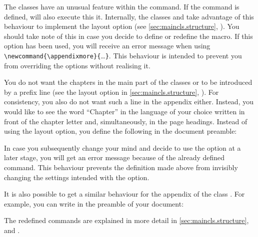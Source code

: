 \begin{Declaration}
\end{Declaration}%
The \KOMAScript{} classes have an unusual feature within the
 command.  If the  command
is defined,  will also execute this
it. Internally, the \KOMAScript{} classes
 and
 take advantage of this behaviour to implement the
 layout option (see
\autoref{sec:maincls.structure},
). You should
take note of this in case you decide to define or redefine the
 macro. If this option has been used, you will receive an
error message when using \verb|\newcommand{\appendixmore}{|\dots\verb|}|. This
behaviour is intended to prevent you from overriding the options without
realising it.

\begin{Example}
  You do not want the chapters in the main part of the classes 
  or  to be introduced by a prefix line (see the
   layout option in
  \autoref{sec:maincls.structure},
  ). For consistency, you also do
  not want such a line in the appendix either. Instead, you would like to see
  the word ``Chapter'' in the language of your choice written in front of the
  chapter letter and, simultaneously, in the page headings.  Instead of using
  the  layout option, you define the
  following in the document preamble:
%
\begin{lstcode}
  \newcommand*{\appendixmore}{%
    \renewcommand*{\chapterformat}{%
      \appendixname~\thechapter\autodot\enskip}
    \renewcommand*{\chaptermarkformat}{%
      \appendixname~\thechapter\autodot\enskip}
  }
\end{lstcode}
%  
  In case you subsequently change your mind and decide to use the option
   at a later stage, you will get an
  error message because of the already defined  command.
  This behaviour prevents the definition made above from invisibly changing
  the settings intended with the option.
  
  It is also possible to get a similar behaviour for the appendix of the class
  . For example, you can write in the preamble of your
  document:
\begin{lstcode}[moretexcs={ifthenelse,equal}]
  \newcommand*{\appendixmore}{%
    \renewcommand*{\sectionformat}{%
      \appendixname~\thesection\autodot\enskip}%
    \renewcommand*{\sectionmarkformat}{%
      \appendixname~\thesection\autodot\enskip}}
\end{lstcode}
  
  The redefined commands are explained in more detail in
  \autoref{sec:maincls.structure},
   and
  .
\end{Example}
%
\EndIndexGroup



